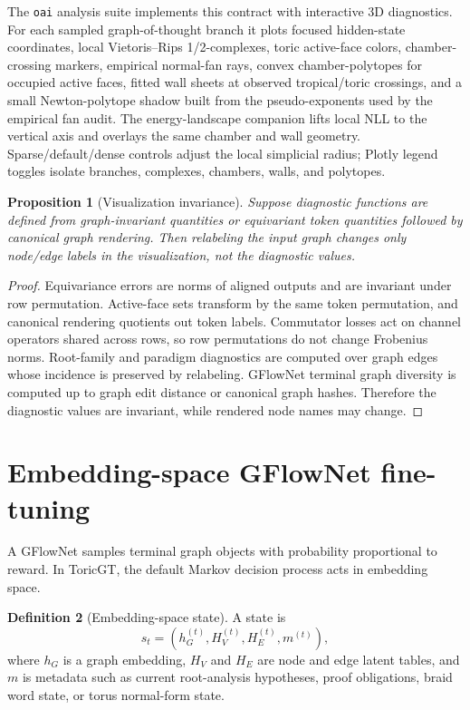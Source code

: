 \documentclass[11pt]{article}
\theoremstyle{definition}
\newtheorem{definition}{Definition}[section]
\theoremstyle{plain}
\newtheorem{proposition}[definition]{Proposition}
\theoremstyle{remark}
\numberwithin{equation}{section}
\begin{document}
The \texttt{oai} analysis suite implements this contract with interactive 3D diagnostics.  For each sampled graph-of-thought branch it plots focused hidden-state coordinates, local Vietoris--Rips 1/2-complexes, toric active-face colors, chamber-crossing markers, empirical normal-fan rays, convex chamber-polytopes for occupied active faces, fitted wall sheets at observed tropical/toric crossings, and a small Newton-polytope shadow built from the pseudo-exponents used by the empirical fan audit.  The energy-landscape companion lifts local NLL to the vertical axis and overlays the same chamber and wall geometry.  Sparse/default/dense controls adjust the local simplicial radius; Plotly legend toggles isolate branches, complexes, chambers, walls, and polytopes.

\begin{proposition}[Visualization invariance]
Suppose diagnostic functions are defined from graph-invariant quantities or equivariant token quantities followed by canonical graph rendering.  Then relabeling the input graph changes only node/edge labels in the visualization, not the diagnostic values.
\end{proposition}

\begin{proof}
Equivariance errors are norms of aligned outputs and are invariant under row permutation.  Active-face sets transform by the same token permutation, and canonical rendering quotients out token labels.  Commutator losses act on channel operators shared across rows, so row permutations do not change Frobenius norms.  Root-family and paradigm diagnostics are computed over graph edges whose incidence is preserved by relabeling.  GFlowNet terminal graph diversity is computed up to graph edit distance or canonical graph hashes.  Therefore the diagnostic values are invariant, while rendered node names may change.
\end{proof}

\section{Embedding-space GFlowNet fine-tuning}

A GFlowNet samples terminal graph objects with probability proportional to reward.  In ToricGT, the default Markov decision process acts in embedding space.

\begin{definition}[Embedding-space state]
A state is
\begin{equation}
  s_t=(h_G^{(t)},H_V^{(t)},H_E^{(t)},m^{(t)}),
\end{equation}
where $h_G$ is a graph embedding, $H_V$ and $H_E$ are node and edge latent tables, and $m$ is metadata such as current root-analysis hypotheses, proof obligations, braid word state, or torus normal-form state.
\end{definition}
\end{document}
